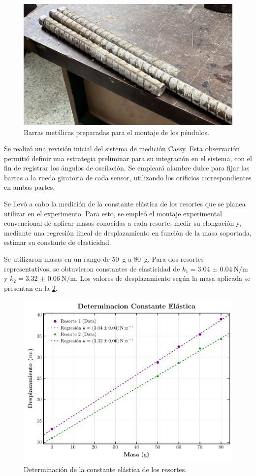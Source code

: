 \begin{figure}[htbp!]
	\centering
	\includegraphics[width=0.7\linewidth]{./Figures/metal-bars.jpeg}
	\caption{Barras metálicas preparadas para el montaje de los péndulos.}
	\label{fig:metal-bars}
\end{figure}

Se realizó una revisión inicial del sistema de medición Cassy.
Esta observación permitió definir una estrategia preliminar para
su integración en el sistema, con el fin de registrar los
ángulos de oscilación. Se empleará alambre dulce para fijar las
barras a la rueda giratoria de cada sensor, utilizando los
orificios correspondientes en ambas partes.

Se llevó a cabo la medición de la constante elástica de los
resortes que se planea utilizar en el experimento. Para esto,
se empleó el montaje experimental convencional de aplicar masas
conocidas a cada resorte, medir su elongación y, mediante una
regresión lineal de desplazamiento en función de la masa soportada,
estimar su constante de elasticidad.

Se utilizaron masas en un rango de \qty{50}{\gram} a \qty{80}{\gram}.
Para dos resortes representativos, se obtuvieron constantes de
elasticidad de \(k_1 = \qty{3.04(4)}{\N\per\m}\) y
\(k_2 = \qty{3.32(6)}{\N\per\m}\). Los valores de desplazamiento
según la masa aplicada se presentan en la \cref{fig:springs-plot}.

\begin{figure}[htbp!]
	\centering
	\includegraphics[width=0.6\linewidth]{./Figures/springs-plot.pdf}
	\caption{Determinación de la constante elástica de los resortes.}
	\label{fig:springs-plot}
\end{figure}
